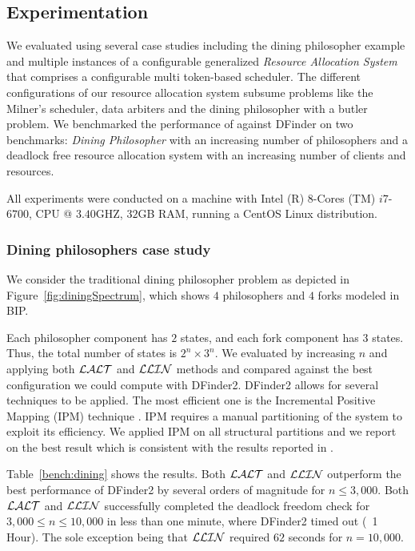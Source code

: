 \subsection{Experimentation}
\label{s:experiments}
%

We evaluated \deadlocktool{} using several case studies including the dining philosopher example and multiple instances
of a configurable generalized {\em Resource Allocation System} that comprises 
a configurable multi token-based scheduler.
The different configurations of our resource allocation system subsume problems like the Milner's scheduler, 
data arbiters and the dining philosopher with a butler problem. 
We benchmarked the performance of \deadlocktool{} against DFinder \cite{DFinder2}
on two benchmarks: 
{\em Dining Philosopher} with an increasing number of philosophers and 
a deadlock free resource allocation system with an increasing number of clients and resources. 

All experiments were conducted on a machine with Intel (R) $8$-Cores (TM) $i7$-$6700$, CPU @ $3.40$GHZ, $32$GB RAM, 
running a CentOS Linux distribution. 

\subsubsection{Dining philosophers case study} 
We consider the traditional dining philosopher problem as depicted in 
Figure~\ref{fig:diningSpectrum}, which shows $4$ philosophers and $4$ forks modeled in BIP. 

Each philosopher component has $2$ states, and each fork component has $3$ states. 
Thus, the total number of states is $2^n \times 3^n$. 
We evaluated \deadlocktool{} by increasing $n$ and applying both $\mathcal{LALT}$ and $\mathcal{LLIN}$ methods and compared against the best configuration 
we could compute with DFinder2. 
DFinder2 allows for several techniques to be applied. The most efficient one is 
the Incremental Positive Mapping (IPM) technique \cite{DFinder2}. 
IPM requires a manual partitioning of the system to exploit its efficiency. 
We applied IPM on all structural partitions and we report on the best result which is consistent 
with the results reported in . 

Table~\ref{bench:dining} shows the results. Both $\mathcal{LALT}$ and $\mathcal{LLIN}$ outperform the best performance of DFinder2 by several orders of magnitude 
for $n\leq 3,000$. Both $\mathcal{LALT}$ and $\mathcal{LLIN}$ successfully completed the deadlock freedom check for $3,000 \leq n \leq 10,000$ 
in less than one minute, where DFinder2 timed out (~1 Hour). The sole exception being that
$\mathcal{LLIN}$ required $62$ seconds for $n=10,000$. 


